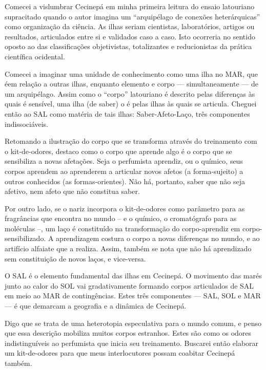 Comecei a vislumbrar Cecinepá em minha primeira leitura do ensaio latouriano supracitado quando o autor imagina um \enquote{arquipélago de conexões heterárquicas} como organização da ciência. As ilhas seriam cientistas, laboratórios, artigos ou resultados, articulados entre si e validados caso a caso. Isto ocorreria no sentido oposto ao das classificações objetivistas, totalizantes e reducionistas da prática científica ocidental.

Comecei a imaginar uma unidade de conhecimento como uma ilha no MAR, que \guillemetleft é\guillemetright em relação a outras ilhas, enquanto elemento e corpo --- simultaneamente --- de um arquipélago. Assim como o \enquote{corpo} latouriano é descrito pelas diferenças às quais é sensível, uma ilha (de saber) o é pelas ilhas às quais se articula. Cheguei então ao SAL como matéria de tais ilhas: Saber-Afeto-Laço, três componentes indissociáveis.

Retomando a ilustração do corpo que se transforma através do treinamento com o kit-de-odores, destaco como o corpo que aprende algo é o corpo que se sensibiliza a novas afetações. Seja o perfumista aprendiz, ou o químico, seus corpos aprendem ao aprenderem a articular novos afetos (a forma-sujeito) a outros conhecidos (as formas-orientes). Não há, portanto, saber que não seja afetivo, nem afeto que não constitua saber.

Por outro lado, se o nariz incorpora o kit-de-odores como parâmetro para as fragrâncias que encontra no mundo -- e o químico, o cromatógrafo para as moléculas --, um laço é constituído na transformação do corpo-aprendiz em corpo-sensibilizado. A aprendizagem costura o corpo a novas diferenças no mundo, e ao artifício alfaiate que a realiza. Assim, também se nota que não há aprendizado sem constituição de novos laços, e vice-versa.

O SAL é o elemento fundamental das ilhas em Cecinepá. O movimento das marés junto ao calor do SOL vai gradativamente formando corpos articulados de SAL em meio ao MAR de contingências. Estes três componentes --- SAL, SOL e MAR --- é que demarcam a geografia e a dinâmica de Cecinepá.

Digo que se trata de uma heterotopia especulativa para o mundo comum, e penso que essa descrição mobiliza muitos corpos estranhos. Estes são como os odores indistinguíveis ao perfumista que inicia seu treinamento. Buscarei então elaborar um kit-de-odores para que meus interlocutores possam coabitar Cecinepá também.

